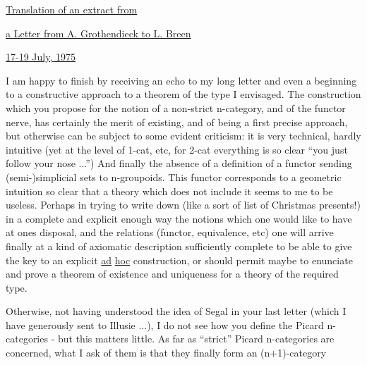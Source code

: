 \uline{Translation of an extract from}

\uline{a Letter from A. Grothendieck to L. Breen}

\uline{17-19 July, 1975}

I am happy to finish by receiving an echo to my long letter
and even a beginning to a constructive approach to a theorem of
the type I envisaged.  The construction which you propose for the
notion of a non-strict n-category, and of the functor nerve, has
certainly the merit of existing, and of being a first precise
approach, but otherwise can be  subject to some evident criticism:
it is very technical, hardly intuitive (yet at the level of
1-cat, etc, for 2-cat everything  is so clear ``you just follow
your nose ...'')  And finally the absence of a definition of a
functor sending (semi-)simplicial sets to n-groupoids.  This
functor corresponds to a geometric intuition so clear that a theory
which does not include it seems to me to be useless.  Perhaps
in trying to write down (like a sort of list of Christmas presents!)
in a complete and explicit enough way the notions which one would
like to have at ones disposal, and the relations (functor,
equivalence, etc) one will arrive finally at a kind of axiomatic
description sufficiently complete to be able to give the key to
an explicit \uline{ad} \uline{hoc} construction, or should permit maybe to enunciate
and prove a theorem of existence and uniqueness for a theory of
the required type.

Otherwise, not having understood the idea of Segal in your
last letter (which I have generously sent to Illusie ...), I do
not see how you define the Picard n-categories - but this matters
little.  As far as ``strict'' Picard n-categories are concerned,
what I ask of them is that they finally form an (n+1)-category

